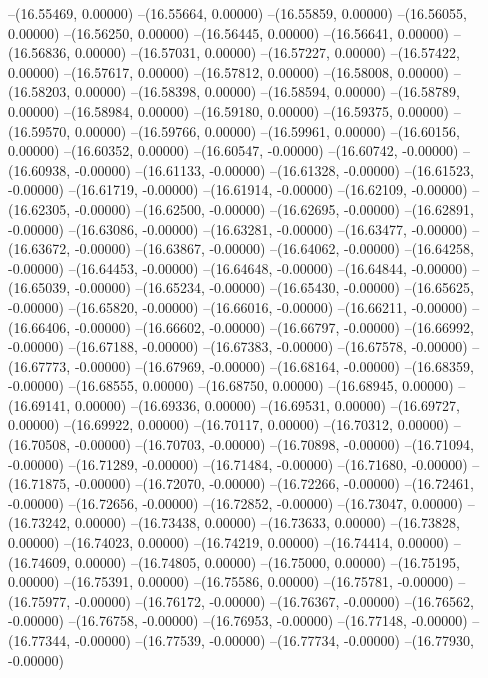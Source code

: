 --(16.55469, 0.00000)
--(16.55664, 0.00000)
--(16.55859, 0.00000)
--(16.56055, 0.00000)
--(16.56250, 0.00000)
--(16.56445, 0.00000)
--(16.56641, 0.00000)
--(16.56836, 0.00000)
--(16.57031, 0.00000)
--(16.57227, 0.00000)
--(16.57422, 0.00000)
--(16.57617, 0.00000)
--(16.57812, 0.00000)
--(16.58008, 0.00000)
--(16.58203, 0.00000)
--(16.58398, 0.00000)
--(16.58594, 0.00000)
--(16.58789, 0.00000)
--(16.58984, 0.00000)
--(16.59180, 0.00000)
--(16.59375, 0.00000)
--(16.59570, 0.00000)
--(16.59766, 0.00000)
--(16.59961, 0.00000)
--(16.60156, 0.00000)
--(16.60352, 0.00000)
--(16.60547, -0.00000)
--(16.60742, -0.00000)
--(16.60938, -0.00000)
--(16.61133, -0.00000)
--(16.61328, -0.00000)
--(16.61523, -0.00000)
--(16.61719, -0.00000)
--(16.61914, -0.00000)
--(16.62109, -0.00000)
--(16.62305, -0.00000)
--(16.62500, -0.00000)
--(16.62695, -0.00000)
--(16.62891, -0.00000)
--(16.63086, -0.00000)
--(16.63281, -0.00000)
--(16.63477, -0.00000)
--(16.63672, -0.00000)
--(16.63867, -0.00000)
--(16.64062, -0.00000)
--(16.64258, -0.00000)
--(16.64453, -0.00000)
--(16.64648, -0.00000)
--(16.64844, -0.00000)
--(16.65039, -0.00000)
--(16.65234, -0.00000)
--(16.65430, -0.00000)
--(16.65625, -0.00000)
--(16.65820, -0.00000)
--(16.66016, -0.00000)
--(16.66211, -0.00000)
--(16.66406, -0.00000)
--(16.66602, -0.00000)
--(16.66797, -0.00000)
--(16.66992, -0.00000)
--(16.67188, -0.00000)
--(16.67383, -0.00000)
--(16.67578, -0.00000)
--(16.67773, -0.00000)
--(16.67969, -0.00000)
--(16.68164, -0.00000)
--(16.68359, -0.00000)
--(16.68555, 0.00000)
--(16.68750, 0.00000)
--(16.68945, 0.00000)
--(16.69141, 0.00000)
--(16.69336, 0.00000)
--(16.69531, 0.00000)
--(16.69727, 0.00000)
--(16.69922, 0.00000)
--(16.70117, 0.00000)
--(16.70312, 0.00000)
--(16.70508, -0.00000)
--(16.70703, -0.00000)
--(16.70898, -0.00000)
--(16.71094, -0.00000)
--(16.71289, -0.00000)
--(16.71484, -0.00000)
--(16.71680, -0.00000)
--(16.71875, -0.00000)
--(16.72070, -0.00000)
--(16.72266, -0.00000)
--(16.72461, -0.00000)
--(16.72656, -0.00000)
--(16.72852, -0.00000)
--(16.73047, 0.00000)
--(16.73242, 0.00000)
--(16.73438, 0.00000)
--(16.73633, 0.00000)
--(16.73828, 0.00000)
--(16.74023, 0.00000)
--(16.74219, 0.00000)
--(16.74414, 0.00000)
--(16.74609, 0.00000)
--(16.74805, 0.00000)
--(16.75000, 0.00000)
--(16.75195, 0.00000)
--(16.75391, 0.00000)
--(16.75586, 0.00000)
--(16.75781, -0.00000)
--(16.75977, -0.00000)
--(16.76172, -0.00000)
--(16.76367, -0.00000)
--(16.76562, -0.00000)
--(16.76758, -0.00000)
--(16.76953, -0.00000)
--(16.77148, -0.00000)
--(16.77344, -0.00000)
--(16.77539, -0.00000)
--(16.77734, -0.00000)
--(16.77930, -0.00000)
